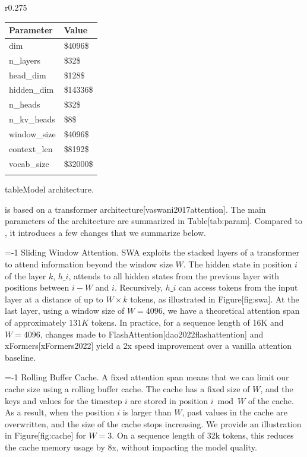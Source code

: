 \documentclass[11pt,a4paper]{article}
\begin{document}
r0.275

\begin{table}[h]
\begin{tabular}{|l|l|}
\hline
Parameter & Value \\ \hline
dim & \$4096\$ \\ \hline
n\_layers & \$32\$ \\ \hline
head\_dim & \$128\$ \\ \hline
hidden\_dim & \$14336\$ \\ \hline
n\_heads & \$32\$ \\ \hline
n\_kv\_heads & \$8\$ \\ \hline
window\_size & \$4096\$ \\ \hline
context\_len & \$8192\$ \\ \hline
vocab\_size & \$32000\$ \\ \hline
 &  \\ \hline
\end{tabular}
\end{table}

tableModel architecture.

is based on a transformer architecture[vaswani2017attention]. The main parameters of the architecture are summarized in Table[tab:param]. Compared to , it introduces a few changes that we summarize below.

=-1 Sliding Window Attention. SWA exploits the stacked layers of a transformer to attend information beyond the window size $W$.
The hidden state in position $i$ of the layer $k$, $h\_i$, attends to all hidden states from the previous layer with positions between $i-W$ and $i$.
Recursively, $h\_i$ can access tokens from the input layer at a distance of up to $W \times k$ tokens, as illustrated in Figure[fig:swa].
At the last layer, using a window size of $W=4096$, we have a theoretical attention span of approximately $131K$ tokens.
In practice, for a sequence length of 16K and $W=4096$, changes made to FlashAttention[dao2022flashattention] and xFormers[xFormers2022] yield a 2x speed improvement over a vanilla attention baseline.

=-1 Rolling Buffer Cache. A fixed attention span means that we can limit our cache size using a rolling buffer cache.
The cache has a fixed size of $W$, and the keys and values for the timestep $i$ are stored in position $i \bmod W$ of the cache. As a result, when the position $i$ is larger than $W$, past values in the cache are overwritten, and the size of the cache stops increasing. We provide an illustration in Figure[fig:cache] for $W=3$.
On a sequence length of 32k tokens, this reduces the cache memory usage by 8x, without impacting the model quality.
\end{document}
